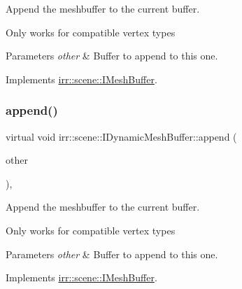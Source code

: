 Append the meshbuffer to the current buffer. 

Only works for compatible vertex types 
\begin{DoxyParams}{Parameters}
{\em other} & Buffer to append to this one. \\
\hline
\end{DoxyParams}


Implements \hyperlink{classirr_1_1scene_1_1IMeshBuffer_a79d2737962579138183ed0fd324310b3}{irr\+::scene\+::\+I\+Mesh\+Buffer}.

\mbox{\label{classirr_1_1scene_1_1IDynamicMeshBuffer_aada30374517d2a52d6264b6359a1e35c}} 
\subsubsection{\texorpdfstring{append()}{append()}\hspace{0.1cm}{\footnotesize\ttfamily [4/4]}}
{\footnotesize\ttfamily virtual void irr\+::scene\+::\+I\+Dynamic\+Mesh\+Buffer\+::append (\begin{DoxyParamCaption}\item[{const \hyperlink{classirr_1_1scene_1_1IMeshBuffer}{I\+Mesh\+Buffer} $\ast$const}]{other }\end{DoxyParamCaption})\hspace{0.3cm}{\ttfamily [inline]}, {\ttfamily [virtual]}}



Append the meshbuffer to the current buffer. 

Only works for compatible vertex types 
\begin{DoxyParams}{Parameters}
{\em other} & Buffer to append to this one. \\
\hline
\end{DoxyParams}


Implements \hyperlink{classirr_1_1scene_1_1IMeshBuffer_a79d2737962579138183ed0fd324310b3}{irr\+::scene\+::\+I\+Mesh\+Buffer}.

\mbox{\label{classirr_1_1scene_1_1IDynamicMeshBuffer_a9053baee5a13c8b51e306d99e5ef7427}} 
